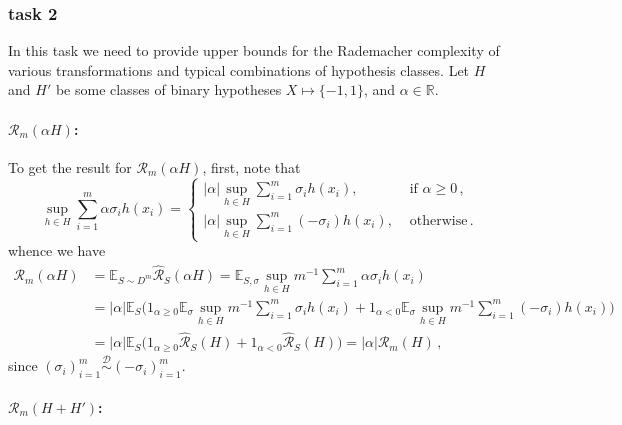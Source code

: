 \documentclass[a4paper]{article}
\newcommand{\Real}{\mathbb{R}}
\newcommand{\ex}{\mathbb{E}}
\begin{document}

\subsubsection{task 2} %
\label{ssub:task_2a2}

In this task we need to provide upper bounds for the Rademacher complexity of various
transformations and typical combinations of hypothesis classes. Let $H$ and $H'$
be some classes of binary hypotheses $X\mapsto\{-1, 1\}$, and $\alpha\in \Real$.

\paragraph{$\mathcal{R}_m(\alpha H)$:} %
\label{par:r_m_alpha_h}

To get the result for $\mathcal{R}_m(\alpha H)$, first, note that
\begin{equation*}
  \sup_{h\in H} \sum_{i=1}^m \alpha \sigma_i h(x_i)
    =\begin{cases}
      |\alpha| \sup_{h\in H} \sum_{i=1}^m \sigma_i h(x_i), &\text{ if }\alpha \geq 0 \,,\\
      |\alpha| \sup_{h\in H} \sum_{i=1}^m (-\sigma_i) h(x_i), &\text{ otherwise}\,.
    \end{cases}
\end{equation*}
whence we have
\begin{align*}
  \mathcal{R}_m(\alpha H)
    &= \ex_{S\sim D^m} \hat{\mathcal{R}}_S(\alpha H)
    = \ex_{S, \sigma} \sup_{h\in H} m^{-1} \sum_{i=1}^m \alpha \sigma_i h(x_i) \\
    &= |\alpha| \ex_S \bigl(
         1_{\alpha\geq 0} \ex_\sigma \sup_{h\in H} m^{-1} \sum_{i=1}^m \sigma_i h(x_i) 
       + 1_{\alpha < 0} \ex_\sigma \sup_{h\in H} m^{-1} \sum_{i=1}^m (-\sigma_i) h(x_i)
       \bigr)\\
    &= |\alpha| \ex_S \bigl(
         1_{\alpha\geq 0} \hat{\mathcal{R}}_S(H)
       + 1_{\alpha < 0} \hat{\mathcal{R}}_S(H)
       \bigr)
    = |\alpha| \mathcal{R}_m(H) \,,
\end{align*}
since $(\sigma_i)_{i=1}^m \overset{\mathcal{D}}{\sim} (-\sigma_i)_{i=1}^m$.


\paragraph{$\mathcal{R}_m(H+H')$:} %
\label{par:r_m_h_hh}
\end{document}
